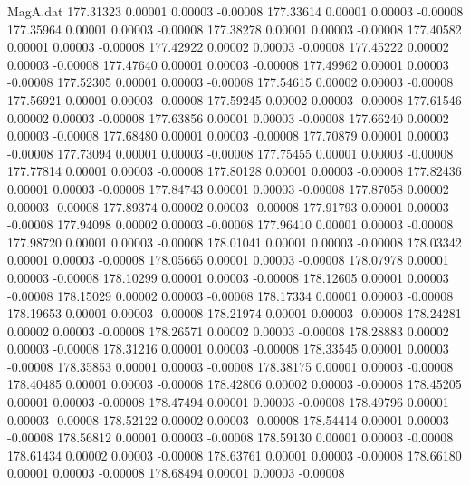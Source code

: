 \begin{filecontents}{MagA.dat}
 177.31323    0.00001    0.00003   -0.00008
 177.33614    0.00001    0.00003   -0.00008
 177.35964    0.00001    0.00003   -0.00008
 177.38278    0.00001    0.00003   -0.00008
 177.40582    0.00001    0.00003   -0.00008
 177.42922    0.00002    0.00003   -0.00008
 177.45222    0.00002    0.00003   -0.00008
 177.47640    0.00001    0.00003   -0.00008
 177.49962    0.00001    0.00003   -0.00008
 177.52305    0.00001    0.00003   -0.00008
 177.54615    0.00002    0.00003   -0.00008
 177.56921    0.00001    0.00003   -0.00008
 177.59245    0.00002    0.00003   -0.00008
 177.61546    0.00002    0.00003   -0.00008
 177.63856    0.00001    0.00003   -0.00008
 177.66240    0.00002    0.00003   -0.00008
 177.68480    0.00001    0.00003   -0.00008
 177.70879    0.00001    0.00003   -0.00008
 177.73094    0.00001    0.00003   -0.00008
 177.75455    0.00001    0.00003   -0.00008
 177.77814    0.00001    0.00003   -0.00008
 177.80128    0.00001    0.00003   -0.00008
 177.82436    0.00001    0.00003   -0.00008
 177.84743    0.00001    0.00003   -0.00008
 177.87058    0.00002    0.00003   -0.00008
 177.89374    0.00002    0.00003   -0.00008
 177.91793    0.00001    0.00003   -0.00008
 177.94098    0.00002    0.00003   -0.00008
 177.96410    0.00001    0.00003   -0.00008
 177.98720    0.00001    0.00003   -0.00008
 178.01041    0.00001    0.00003   -0.00008
 178.03342    0.00001    0.00003   -0.00008
 178.05665    0.00001    0.00003   -0.00008
 178.07978    0.00001    0.00003   -0.00008
 178.10299    0.00001    0.00003   -0.00008
 178.12605    0.00001    0.00003   -0.00008
 178.15029    0.00002    0.00003   -0.00008
 178.17334    0.00001    0.00003   -0.00008
 178.19653    0.00001    0.00003   -0.00008
 178.21974    0.00001    0.00003   -0.00008
 178.24281    0.00002    0.00003   -0.00008
 178.26571    0.00002    0.00003   -0.00008
 178.28883    0.00002    0.00003   -0.00008
 178.31216    0.00001    0.00003   -0.00008
 178.33545    0.00001    0.00003   -0.00008
 178.35853    0.00001    0.00003   -0.00008
 178.38175    0.00001    0.00003   -0.00008
 178.40485    0.00001    0.00003   -0.00008
 178.42806    0.00002    0.00003   -0.00008
 178.45205    0.00001    0.00003   -0.00008
 178.47494    0.00001    0.00003   -0.00008
 178.49796    0.00001    0.00003   -0.00008
 178.52122    0.00002    0.00003   -0.00008
 178.54414    0.00001    0.00003   -0.00008
 178.56812    0.00001    0.00003   -0.00008
 178.59130    0.00001    0.00003   -0.00008
 178.61434    0.00002    0.00003   -0.00008
 178.63761    0.00001    0.00003   -0.00008
 178.66180    0.00001    0.00003   -0.00008
 178.68494    0.00001    0.00003   -0.00008

\end{filecontents}
